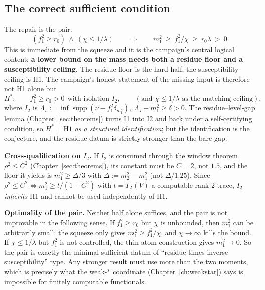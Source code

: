\subsection{The correct sufficient condition}

The repair is the pair:
\begin{equation}
(f_1^2\ge r_0)\ \wedge\ (\chi\le1/\lambda)
\qquad\Longrightarrow\qquad
m_1^2\ \ge\ f_1^2/\chi\ \ge\ r_0\lambda\ >\ 0 .
\label{eq:sufficient}
\end{equation}
This is immediate from the squeeze and it is the campaign's central logical content: \textbf{a
lower bound on the mass needs both a residue floor and a susceptibility ceiling.} The residue
floor is the hard half; the susceptibility ceiling is H1. The campaign's honest statement of the
missing input is therefore not H1 alone but
\begin{equation}
H^*:\qquad f_1^2\ge r_0>0\ \ \text{with isolation } I_2,
\qquad(\text{and }\chi\le1/\lambda\text{ as the matching ceiling}),
\label{eq:hstar}
\end{equation}
where $I_2$ is $\Lambda_{\star}:=\inf\operatorname{supp}(\nu-f_1^2\delta_{m_1^2})$,
$\Lambda_{\star}-m_1^2\ge\delta>0$. The residue--level-gap lemma (Chapter~\ref{sec:theorems})
turns I1 into I2 and back under a self-certifying condition, so $H^*=\text{H1}$ \emph{as a
structural identification}; but the identification is the conjecture, and the residue datum is
strictly stronger than the bare gap.

\textbf{Cross-qualification on $I_2$.} If $I_2$ is consumed through the window theorem
$\rho^2\le C^2$ (Chapter~\ref{sec:theorems}), its constant must be $C=2$, not $1.5$, and the floor it
yields is $m_1^2\ge\Delta/3$ with $\Delta:=m_2^2-m_1^2$ (not $\Delta/1.25$). Since
$\rho^2\le C^2\iff m_1^2\ge t/(1+C^2)$ with $t=T_2(V)$ a computable rank-2 trace, $I_2$ \emph{inherits}
H1 and cannot be used independently of H1. \LN

\textbf{Optimality of the pair.} Neither half alone suffices, and the pair is not improvable in
the following sense. If $f_1^2\ge r_0$ but $\chi$ is unbounded, then $m_1^2$ can be arbitrarily
small: the squeeze only gives $m_1^2\ge f_1^2/\chi$, and $\chi\to\infty$ kills the bound. If
$\chi\le1/\lambda$ but $f_1^2$ is not controlled, the thin-atom construction gives
$m_1^2\to0$. So the pair is exactly the minimal sufficient datum of ``residue times inverse
susceptibility'' type. Any stronger result must use more than the two moments, which is precisely
what the weak-$*$ coordinate (Chapter~\ref{ch:weakstar}) says is impossible for finitely
computable functionals.

